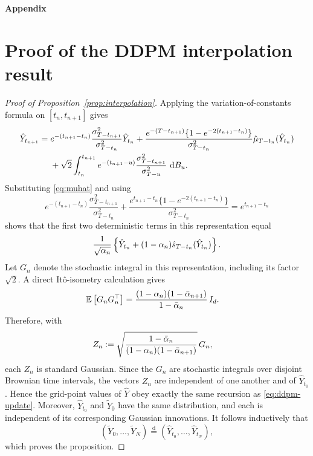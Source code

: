\documentclass[11pt]{article}
\theoremstyle{definition}
\newcommand{\E}{\mathbb{E}}
\newcommand{\Id}{I_d}
\newcommand{\dd}{\,\mathrm{d}}
\begin{document}
\clearpage
\appendix

\begin{center}
    {\LARGE\bfseries Appendix}
\end{center}
\vspace{1.5em}

\section{Proof of the DDPM interpolation result}
\label{app:interpolation-proof}

\begin{proof}[Proof of Proposition~\ref{prop:interpolation}]
Applying the variation-of-constants formula on $[t_n,t_{n+1}]$ gives
\begin{align}
\hat Y_{t_{n+1}}
={}&e^{-(t_{n+1}-t_n)}
\frac{\sigma_{T-t_{n+1}}^2}{\sigma_{T-t_n}^2}\hat Y_{t_n}
+\frac{e^{-(T-t_{n+1})}\{1-e^{-2(t_{n+1}-t_n)}\}}{\sigma_{T-t_n}^2}
 \hat\mu_{T-t_n}(\hat Y_{t_n})\notag\\
&+\sqrt{2}\int_{t_n}^{t_{n+1}}
 e^{-(t_{n+1}-u)}
 \frac{\sigma_{T-t_{n+1}}^2}{\sigma_{T-u}^2}\,\dd B_u.
\notag
\end{align}
Substituting \eqref{eq:muhat} and using
\[
 e^{-(t_{n+1}-t_n)}
 \frac{\sigma_{T-t_{n+1}}^2}{\sigma_{T-t_n}^2}
 +\frac{e^{t_{n+1}-t_n}\{1-e^{-2(t_{n+1}-t_n)}\}}
 {\sigma_{T-t_n}^2}
 =e^{t_{n+1}-t_n}
\]
shows that the first two deterministic terms in this representation
equal
\begin{align}
    \frac{1}{\sqrt{\alpha_n}}
    \left\{
        \hat Y_{t_n}
        +(1-\alpha_n)
        \hat s_{T-t_n}(\hat Y_{t_n})
    \right\}.
    \notag
\end{align}
Let $G_n$ denote the stochastic integral in this representation,
including its factor $\sqrt{2}$.
A direct It\^o-isometry calculation gives
\begin{align}
    \E\left[G_nG_n^\top\right]
    &=
    \frac{(1-\alpha_n)(1-\bar\alpha_{n+1})}
         {1-\bar\alpha_n}\,\Id.
    \notag
\end{align}
Therefore, with
\begin{align}
    Z_n
    &:=
    \sqrt{
        \frac{1-\bar\alpha_n}
             {(1-\alpha_n)(1-\bar\alpha_{n+1})}
    }\,G_n,
    \notag
\end{align}
each $Z_n$ is standard Gaussian. Since the $G_n$ are stochastic
integrals over disjoint Brownian time intervals, the vectors $Z_n$
are independent of one another and of $\hat Y_{t_0}$. Hence the
grid-point values of $\hat Y$ obey exactly the same recursion as
\eqref{eq:ddpm-update}. Moreover,
$\hat Y_{t_0}$ and $\widetilde Y_0$ have the same distribution, and
each is independent of its corresponding Gaussian innovations.
It follows inductively that
\[
    (\widetilde Y_0,\ldots,\widetilde Y_N)
    \overset{\mathrm d}{=}
    (\hat Y_{t_0},\ldots,\hat Y_{t_N}),
\]
which proves the proposition.
\end{proof}
\end{document}
